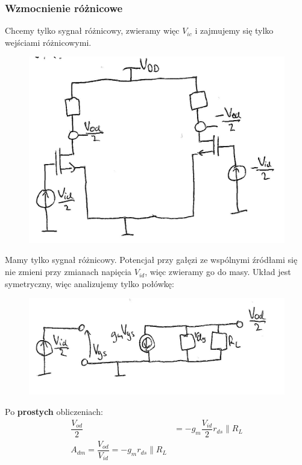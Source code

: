 \documentclass[10pt,a4paper]{article}
\begin{document}
\subsubsection{Wzmocnienie różnicowe}

Chcemy tylko sygnał różnicowy, zwieramy więc $V_{ic}$ i zajmujemy się tylko wejściami różnicowymi.
\begin{figure}[H]
\centering
\includegraphics[scale=1]{roznicowy_roznica}
\end{figure}

Mamy tylko sygnał różnicowy. Potencjał przy gałęzi ze wspólnymi źródłami się nie zmieni przy zmianach napięcia $V_{id}$, więc zwieramy go do masy. Układ jest symetryczny, więc analizujemy tylko połówkę:
\begin{figure}[H]
\centering

\includegraphics[scale=1]{roznicowy_roznica_malosyg}
\end{figure}

Po \textbf{prostych} obliczeniach:
\begin{align*}
\dfrac{V_{od}}{2}&=-g_{m}\dfrac{V_{id}}{2}r_{ds}\parallel R_{L} \\
A_{dm}=\dfrac{V_{od}}{V_{id}}=-g_{m} r_{ds} \parallel R_{L}
\end{align*}
\end{document}

